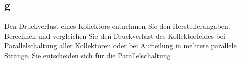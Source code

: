 \subsection{g}
Den Druckverlust eines Kollektors entnehmen Sie den Herstellerangaben. Berechnen und vergleichen
Sie den Druckverlust des Kollektorfeldes bei Parallelschaltung aller Kollektoren oder bei Aufteilung in
mehrere parallele Stränge. Sie entscheiden sich für die Parallelschaltung
